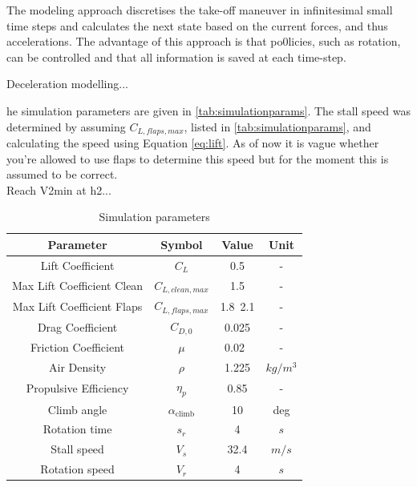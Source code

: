 The modeling approach discretises the take-off maneuver in infinitesimal small time steps and calculates the next state based on the current forces, and thus accelerations. The advantage of this approach is that po0licies, such as rotation, can be controlled and that all information is saved at each time-step.

Deceleration modelling...

he simulation parameters are given in \autoref{tab:simulationparams}. The stall speed was determined by assuming $C_{L,flaps,max}$, listed in \autoref{tab:simulationparams}, and calculating the speed using Equation \eqref{eq:lift}. As of now it is vague whether you're allowed to use flaps to determine this speed but for the moment this is assumed to be correct.\\

Reach V2min at h2...\\

\begin{table}[!ht]
    \centering
    \begin{tabular}{cccc}\hline \hline
        \textbf{Parameter}          & \textbf{Symbol}       & \textbf{Value}                         & \textbf{Unit} \\ \hline
        Lift Coefficient            & $C_L$                 & 0.5                                    & -             \\
        Max Lift Coefficient Clean  & $C_{L,clean,max}$     & 1.5                                    & -             \\
        Max Lift Coefficient Flaps  & $C_{L,flaps,max}$     & 1.8~2.1                                & -             \\
        Drag Coefficient            & $C_{D,0}$             & 0.025                                  & -             \\
        Friction Coefficient        & $\mu$                 & 0.02~\cite{torenbeek2013synthesis}     & -             \\
        Air Density                 & $\rho$                & 1.225                                  & $kg/m^3$      \\
        Propulsive Efficiency       & $\eta_p$              & 0.85                                   & -             \\
        Climb angle                 & $\alpha_\text{climb}$ & 10                                      & deg           \\
        Rotation time               & $s_r$                 & 4                                      & $s$           \\
        Stall speed                 & $V_s$                 & 32.4                                   & $m/s$         \\
        Rotation speed              & $V_r$                 & 4                                      & $s$           \\ \hline
    \end{tabular}
    \caption{Simulation parameters}
    \label{tab:simulationparams}
\end{table}

